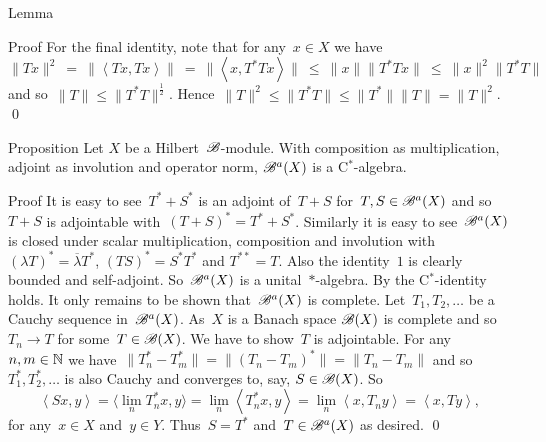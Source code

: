\documentclass[b]{subfiles}
\begin{document}
\begin{parsec}
\begin{point}{Lemma}
\begin{point}{Proof}
For the final identity, note that for any~$x \in X$ we have
\begin{equation*}
\|Tx\|^2 \ =\  \|\left<Tx,Tx\right>\| 
            \ =\  \| \left<x, T^*Tx\right>\|
            \ \leq\  \|x \| \|T^*Tx \|
            \ \leq\  \|x\|^2 \|T^*T\|
\end{equation*}
and so~$\|T\| \leq \|T^*T\|^{\frac{1}{2}}$.
Hence~$\|T\|^2 \leq \|T^*T\| \leq \|T^*\|\|T\| = \|T\|^2$.
    \qed
\end{point}
\end{point}
\begin{point}{Proposition}%
Let $X$ be a Hilbert~$\mathscr{B}$-module.
With composition as multiplication,
    adjoint as involution
    and operator norm,
     $\mathscr{B}^a(X)$ is a C$^*$-algebra.
\begin{point}{Proof}
It is easy to see~$T^*+S^*$ is an adjoint of~$T+S$
    for~$T,S \in \mathscr{B}^a(X)$
    and so~$T+S$ is adjointable with~$(T+S)^* = T^*+ S^*$.
    Similarly it is easy to see~$\mathscr{B}^a(X)$
        is closed under scalar multiplication, composition and involution
        with~$(\lambda T)^* = \overline{\lambda} T^* $,
            $(TS)^* = S^*T^*$ and
            $T^{**} =T$.
Also the identity~$1$ is clearly bounded and self-adjoint.
So~$\mathscr{B}^a(X)$ is a unital~$*$-algebra.
By  
    the C$^*$-identity holds.
It only remains to be shown that~$\mathscr{B}^a(X)$ is complete.
Let~$T_1,T_2,\ldots$ be a Cauchy sequence in~$\mathscr{B}^a(X)$.
As~$X$ is a Banach space $\mathscr{B}(X)$ is complete
    and so~$T_n \to T$ for some~$T \in \mathscr{B}(X)$.
We have to show~$T$ is adjointable.
For any~$n,m \in \mathbb{N}$ we have~$\|T_n^* - T_m^*\|
= \|(T_n - T_m)^*\| = \|T_n - T_m\|$
and so~$T^*_1, T^*_2,\ldots$
is also Cauchy
and converges to, say, $S \in \mathscr{B}(X)$.
So
\begin{equation*}
\left<S x, y\right> =
\langle\lim_{n} T^*_n x, y\rangle = \lim_n \left<T_n^* x, y\right>
                = \lim_n \left<x, T_n y\right>
                =  \left<x, T y\right>,
\end{equation*}
for any~$x \in X$ and~$y \in Y$.
Thus~$S = T^*$ and~$T \in \mathscr{B}^a(X)$ as desired. \qed
\end{point}
\end{point}
\end{parsec}
\end{document}
